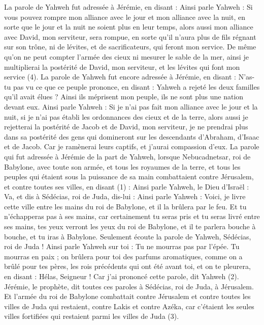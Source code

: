 \begin{multicols}{2}
La parole de Yahweh fut adressée à Jérémie, en disant :
Ainsi parle Yahweh : Si vous pouvez rompre mon alliance avec le jour et mon alliance avec la nuit, en sorte que le jour et la nuit ne soient plus en leur temps,
alors aussi mon alliance avec David, mon serviteur, sera rompue, en sorte qu'il n'aura plus de fils régnant sur son trône, ni de lévites, et de sacrificateurs, qui feront mon service.
De même qu’on ne peut compter l'armée des cieux ni mesurer le sable de la mer, ainsi je multiplierai la postérité de David, mon serviteur, et les lévites qui font mon service\FTNT{} (4).
La parole de Yahweh fut encore adressée à Jérémie, en disant :
N'as-tu pas vu ce que ce peuple prononce, en disant : Yahweh a rejeté les deux familles qu'il avait élues ? Ainsi ils méprisent mon peuple, ils ne sont plus une nation devant eux.
Ainsi parle Yahweh : Si je n'ai pas fait mon alliance avec le jour et la nuit, si je n'ai pas établi les ordonnances des cieux et de la terre,
alors aussi je rejetterai la postérité de Jacob et de David, mon serviteur, je ne prendrai plus dans sa postérité des gens qui domineront sur les descendants d'Abraham, d'Isaac et de Jacob. Car je ramènerai leurs captifs, et j'aurai compassion d'eux.
\VerseOne{}La parole qui fut adressée à Jérémie de la part de Yahweh, lorsque Nebucadnetsar, roi de Babylone, avec toute son armée, et tous les royaumes de la terre, et tous les peuples qui étaient sous la puissance de sa main combattaient contre Jérusalem, et contre toutes ses villes, en disant\FTNT{} (1) :
Ainsi parle Yahweh, le Dieu d'Israël : Va, et dis à Sédécias, roi de Juda, dis-lui : Ainsi parle Yahweh : Voici, je livre cette ville entre les mains du roi de Babylone, et il la brûlera par le feu.
Et tu n'échapperas pas à ses mains, car certainement tu seras pris et tu seras livré entre ses mains, tes yeux verront les yeux du roi de Babylone, et il te parlera bouche à bouche, et tu iras à Babylone.
Seulement écoute la parole de Yahweh, Sédécias, roi de Juda ! Ainsi parle Yahweh sur toi : Tu ne mourras pas par l'épée.
Tu mourras en paix ; on brûlera pour toi des parfums aromatiques, comme on a brûlé pour tes pères, les rois précédents qui ont été avant toi, et on te pleurera, en disant : Hélas, Seigneur ! Car j'ai prononcé cette parole, dit Yahweh\FTNT{} (2).
Jérémie, le prophète, dit toutes ces paroles à Sédécias, roi de Juda, à Jérusalem.
Et l'armée du roi de Babylone combattait contre Jérusalem et contre toutes les villes de Juda qui restaient, contre Lakis et contre Azéka, car c'étaient les seules villes fortifiées qui restaient parmi les villes de Juda\FTNT{} (3).

\end{multicols}
